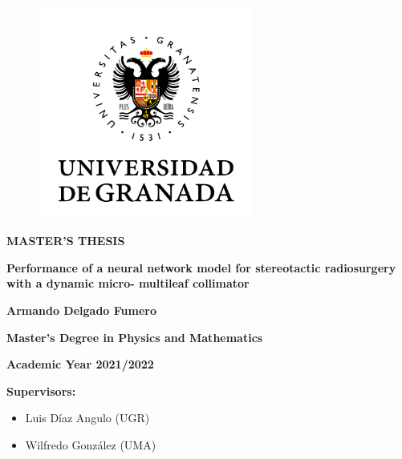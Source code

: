 \documentclass[openany]{article}
\begin{document}

\thispagestyle{empty}    

\begin{titlepage}
\begin{figure}[th]
\begin{flushleft}
    \includegraphics[width=7cm]{ugr.png}
\end{flushleft}
\end{figure}
 \vspace{1cm}

{\flushleft \LARGE \bfseries MASTER'S THESIS\par}\vspace{2cm}

{\flushright \LARGE \bfseries Performance of a neural network model for
stereotactic radiosurgery with a dynamic micro-
multileaf collimator  \par}\vspace{2cm}

{\flushleft \LARGE \bfseries Armando Delgado Fumero \par}\vspace{1.5cm}

{\flushleft \bfseries Master’s Degree in Physics and Mathematics \par}\vspace{0.cm}

{\flushleft \small \bfseries Academic Year 2021/2022\par}
{\flushleft \small \bfseries Supervisors:
\begin{itemize}
    \item Luis Díaz Angulo (UGR)
    \item Wilfredo González (UMA)
\end{itemize}}\vspace{2cm}



\end{titlepage}
\end{document}
